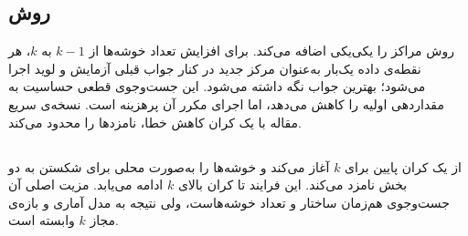 \subsection{روش }

روش  \cite{likas2003} مراکز را یکی‌یکی اضافه می‌کند. برای
افزایش تعداد خوشه‌ها از $k-1$ به $k$، هر نقطه‌ی داده یک‌بار به‌عنوان مرکز
جدید در کنار جواب قبلی آزمایش و لوید اجرا می‌شود؛ بهترین جواب نگه داشته
می‌شود. این جست‌وجوی قطعی حساسیت به مقداردهی اولیه را کاهش می‌دهد، اما
اجرای مکرر آن پرهزینه است. نسخه‌ی سریع مقاله با یک کران کاهش خطا، نامزدها
را محدود می‌کند.

\subsection{}

 \cite{pelleg2000} از یک کران پایین برای $k$ آغاز می‌کند و
خوشه‌ها را به‌صورت محلی برای شکستن به دو بخش نامزد می‌کند. این فرایند تا کران بالای $k$ ادامه
می‌یابد. مزیت اصلی آن جست‌وجوی هم‌زمان ساختار و تعداد خوشه‌هاست، ولی نتیجه
به مدل آماری و بازه‌ی مجاز $k$ وابسته است.
